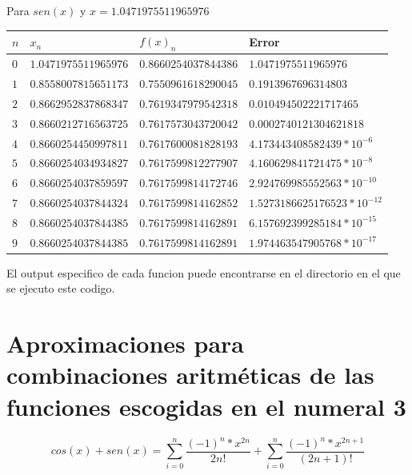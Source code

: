 \documentclass[12pt]{article}
\begin{document}
    Para $sen(x)$ y $x = 1.0471975511965976$
        \begin{center}
            \begin{tabular}{|l|l|l|l|} \hline
            $n$ & $x_{n}$ & $f(x)_{n}$ & Error \\
            \hline \hline
            $0$ & $1.0471975511965976$ & $0.8660254037844386$ & $1.0471975511965976$    \\
            \hline 
            $1$ & $0.8558007815651173$ & $0.7550961618290045$ & $0.1913967696314803$\\
            \hline 
            $2$ & $0.8662952837868347$ & $0.7619347979542318$ & $0.010494502221717465$\\
            \hline 
            $3$ & $0.8660212716563725$ & $0.7617573043720042$ & $0.0002740121304621818$\\
            \hline 
            $4$ & $0.8660254450997811$ & $0.7617600081828193$ & $4.173443408582439 * 10^{-6}$\\
            \hline 
            $5$ & $0.8660254034934827$ & $0.7617599812277907$ & $4.160629841721475 * 10^{-8}$\\
            \hline 
            $6$ & $0.8660254037859597$ & $0.7617599814172746$ & $2.924769985552563 * 10^{-10}$\\
            \hline 
            $7$ & $0.8660254037844324$ & $0.7617599814162852$ & $1.5273186625176523 * 10^{-12}$\\
            \hline 
            $8$ & $0.8660254037844385$ & $0.7617599814162891$ & $6.157692399285184* 10^{-15}$\\
            \hline 
            $9$ & $0.8660254037844385$ & $0.7617599814162891$ & $1.974463547905768* 10^{-17}$\\
            \hline
            \end{tabular}
        \end{center}

    El output especifico de cada funcion puede encontrarse en el directorio en el que se ejecuto este codigo.


        \section {Aproximaciones para combinaciones aritméticas de las funciones escogidas en el numeral 3}

        \begin{equation}
            cos(x) + sen(x) = \sum_{i=0}^{n} \frac{(-1)^{n} * x^{2n}}{2n!} + \sum_{i=0}^{n} \frac{(-1)^{n} * x^{2n + 1}}{(2n + 1)!}
        \end{equation}
        
\end{document}
